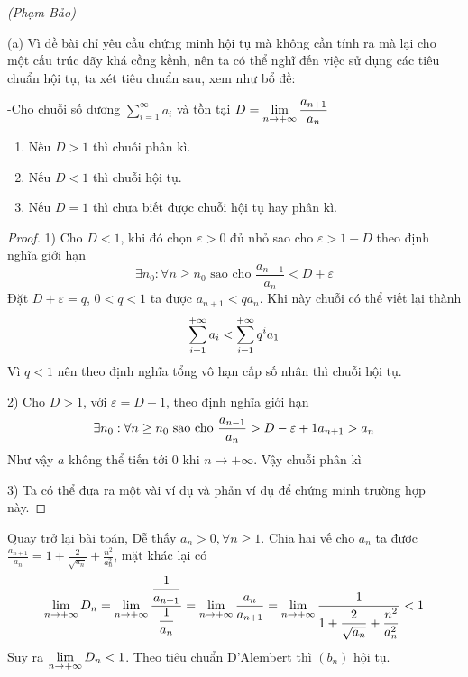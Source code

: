\documentclass[11pt]{scrartcl}
\begin{document}
\begin{itemize}[label=, leftmargin=0em, itemsep=0.5em]
\begin{bt}
    \end{bt}
    \begin{sol}\textit{(Phạm Bảo)}

        (a) Vì đề bài chỉ yêu cầu chứng minh hội tụ mà không cần tính ra mà lại cho một cấu trúc dãy khá cồng kềnh, nên ta có thể nghĩ đến việc sử dụng các tiêu chuẩn hội tụ, ta xét tiêu chuẩn sau, xem như bổ đề: 
        \begin{theo}
            -Cho chuỗi số dương $\displaystyle \sum_{i = 1}^{\infty} a_i$ và tồn tại
            \(D = \dlim\frac{a_{n + 1}}{a_n}\)
            \begin{enumerate}
                \item Nếu $D > 1$ thì chuỗi phân kì.
                \item Nếu $D < 1$ thì chuỗi hội tụ.
                \item Nếu $D = 1$ thì chưa biết được chuỗi hội tụ hay phân kì.
            \end{enumerate}
        \end{theo}
        \begin{proof}

            1) Cho $D < 1$, khi đó chọn $\varepsilon > 0$ đủ nhỏ sao cho $\varepsilon > 1 - D$ theo định nghĩa giới hạn 
            \[
                \exists n_0: \forall n \geq n_0 \text{ sao cho }\frac{a_{n - 1}}{a_n} < D + \varepsilon
            \]
            Đặt $D + \varepsilon = q$, $0 < q < 1$ ta được $a_{n + 1} < qa_n$. Khi này chuỗi có thể viết lại thành 
            \[
            \displaystyle\sum_{i = 1}^{+\infty}a_i < \displaystyle\sum_{i = 1}^{+\infty}q^i a_1
            \]
            Vì $q < 1$ nên theo định nghĩa tổng vô hạn cấp số nhân thì chuỗi hội tụ.

            2) Cho $D > 1$, với $\varepsilon = D -1$, theo định nghĩa giới hạn 
            \[
                \exists n_0: \forall n \geq n_0 \text{ sao cho }\frac{a_{n - 1}}{a_n} > D - \varepsilon + 1 \ra a_{n + 1} > a_n
            \]
            Như vậy $a$ không thể tiến tới $0$ khi $n \to +\infty$. Vậy chuỗi phân kì 

            3) Ta có thể đưa ra một vài ví dụ và phản ví dụ để chứng minh trường hợp này.
        \end{proof}
        Quay trở lại bài toán, Dễ thấy $a_n > 0, \forall n \geq 1$. Chia hai vế cho $a_n$ ta được $\frac{a_{n + 1}}{a_n} = 1 + \frac{2}{\sqrt{a_n}} + \frac{n^2}{a_n^2}$, mặt khác lại có 
        \[
            \dlim D_n = \dlim \frac{\frac{1}{a_{n + 1}}}{\frac{1}{a_n}} = \dlim \frac{a_n}{a_{n + 1}} = \dlim \frac{1}{1 + \frac{2}{\sqrt{a_n}} + \frac{n^2}{a_n^2}} < 1
        \]
        Suy ra $\displaystyle\lim_{n \to +\infty} D_n < 1$. Theo tiêu chuẩn D'Alembert thì $(b_n)$ hội tụ.


\end{sol}
\end{itemize}
\end{document}
